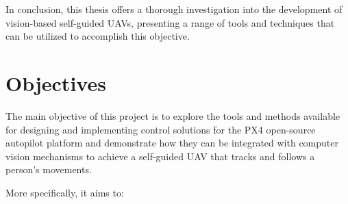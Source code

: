 In conclusion, this thesis offers a thorough investigation into the development of vision-based self-guided UAVs, presenting a range of tools and techniques that can be utilized to accomplish this objective.


\section{Objectives}
\label{sec:objetives}

The main objective of this project is to explore the tools and methods available for designing and implementing control solutions for the PX4 open-source autopilot platform and demonstrate how they can be integrated with computer vision mechanisms to achieve a self-guided UAV that tracks and follows a person's movements.

More specifically, it aims to:
